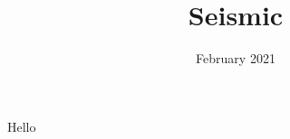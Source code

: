 \documentclass{article}
\title{Seismic}
\author{}
\date{February 2021}
\begin{document}
\maketitle

Hello
\end{document}
